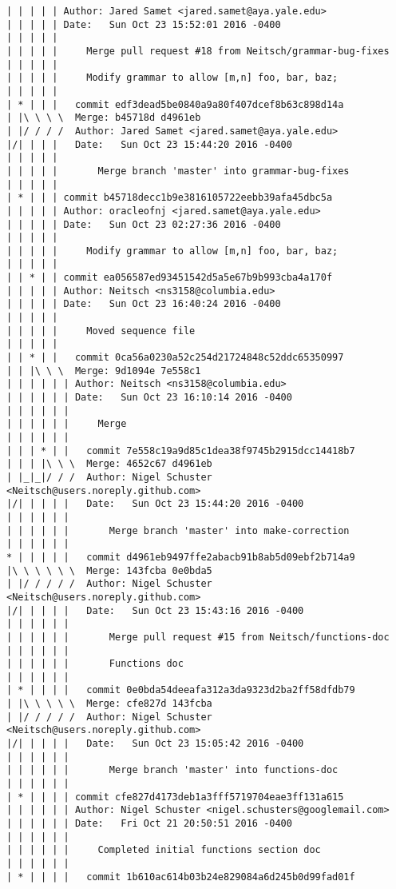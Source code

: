 \begin{lstlisting}
| | | | | Author: Jared Samet <jared.samet@aya.yale.edu>
| | | | | Date:   Sun Oct 23 15:52:01 2016 -0400
| | | | | 
| | | | |     Merge pull request #18 from Neitsch/grammar-bug-fixes
| | | | |     
| | | | |     Modify grammar to allow [m,n] foo, bar, baz;
| | | | |        
| * | | |   commit edf3dead5be0840a9a80f407dcef8b63c898d14a
| |\ \ \ \  Merge: b45718d d4961eb
| |/ / / /  Author: Jared Samet <jared.samet@aya.yale.edu>
|/| | | |   Date:   Sun Oct 23 15:44:20 2016 -0400
| | | | |   
| | | | |       Merge branch 'master' into grammar-bug-fixes
| | | | |      
| * | | | commit b45718decc1b9e3816105722eebb39afa45dbc5a
| | | | | Author: oracleofnj <jared.samet@aya.yale.edu>
| | | | | Date:   Sun Oct 23 02:27:36 2016 -0400
| | | | | 
| | | | |     Modify grammar to allow [m,n] foo, bar, baz;
| | | | |      
| | * | | commit ea056587ed93451542d5a5e67b9b993cba4a170f
| | | | | Author: Neitsch <ns3158@columbia.edu>
| | | | | Date:   Sun Oct 23 16:40:24 2016 -0400
| | | | | 
| | | | |     Moved sequence file
| | | | |        
| | * | |   commit 0ca56a0230a52c254d21724848c52ddc65350997
| | |\ \ \  Merge: 9d1094e 7e558c1
| | | | | | Author: Neitsch <ns3158@columbia.edu>
| | | | | | Date:   Sun Oct 23 16:10:14 2016 -0400
| | | | | | 
| | | | | |     Merge
| | | | | |         
| | | * | |   commit 7e558c19a9d85c1dea38f9745b2915dcc14418b7
| | | |\ \ \  Merge: 4652c67 d4961eb
| |_|_|/ / /  Author: Nigel Schuster <Neitsch@users.noreply.github.com>
|/| | | | |   Date:   Sun Oct 23 15:44:20 2016 -0400
| | | | | |   
| | | | | |       Merge branch 'master' into make-correction
| | | | | |         
* | | | | |   commit d4961eb9497ffe2abacb91b8ab5d09ebf2b714a9
|\ \ \ \ \ \  Merge: 143fcba 0e0bda5
| |/ / / / /  Author: Nigel Schuster <Neitsch@users.noreply.github.com>
|/| | | | |   Date:   Sun Oct 23 15:43:16 2016 -0400
| | | | | |   
| | | | | |       Merge pull request #15 from Neitsch/functions-doc
| | | | | |       
| | | | | |       Functions doc
| | | | | |         
| * | | | |   commit 0e0bda54deeafa312a3da9323d2ba2ff58dfdb79
| |\ \ \ \ \  Merge: cfe827d 143fcba
| |/ / / / /  Author: Nigel Schuster <Neitsch@users.noreply.github.com>
|/| | | | |   Date:   Sun Oct 23 15:05:42 2016 -0400
| | | | | |   
| | | | | |       Merge branch 'master' into functions-doc
| | | | | |       
| * | | | | commit cfe827d4173deb1a3fff5719704eae3ff131a615
| | | | | | Author: Nigel Schuster <nigel.schusters@googlemail.com>
| | | | | | Date:   Fri Oct 21 20:50:51 2016 -0400
| | | | | | 
| | | | | |     Completed initial functions section doc
| | | | | |         
| * | | | |   commit 1b610ac614b03b24e829084a6d245b0d99fad01f

\end{lstlisting}
